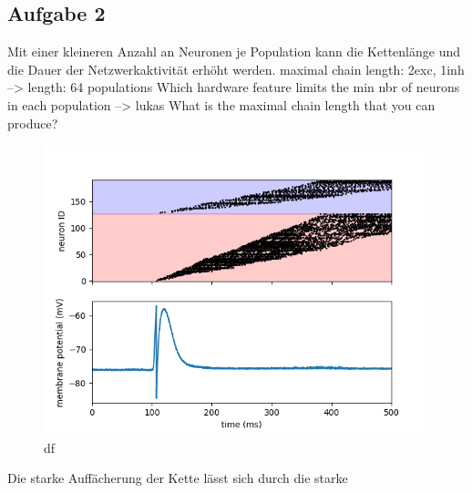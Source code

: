 \documentclass[10pt,a4paper]{scrartcl}
\begin{document}
\newpage 


\subsection{Aufgabe 2}
Mit einer kleineren Anzahl an Neuronen je Population kann die Kettenlänge und die Dauer der Netzwerkaktivität erhöht werden.
maximal chain length: 2exc, 1inh --> length: 64 populations
Which hardware feature limits the min nbr of neurons in each population --> lukas
What is the maximal chain length that you can produce?


\begin{figure} [ht]
\begin{center}
\label{fig:abb4}
\caption{df}
\includegraphics[scale=0.35]{pictures/chainlength_64.png}
\end{center}
\end{figure}

Die starke Auffächerung der Kette lässt sich durch die starke 
\end{document}
